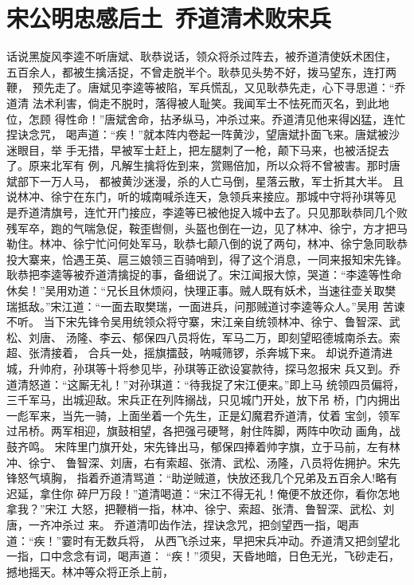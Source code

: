 \chapter{宋公明忠感后土~乔道清术败宋兵}

话说黑旋风李逵不听唐斌、耿恭说话，领众将杀过阵去，被乔道清使妖术困住，
五百余人，都被生擒活捉，不曾走脱半个。耿恭见头势不好，拨马望东，连打两鞭，
预先走了。唐斌见李逵等被陷，军兵慌乱，又见耿恭先走，心下寻思道：“乔道清
法术利害，倘走不脱时，落得被人耻笑。我闻军士不怯死而灭名，到此地位，怎顾
得性命！”唐斌舍命，拈矛纵马，冲杀过来。乔道清见他来得凶猛，连忙捏诀念咒，
喝声道：“疾！”就本阵内卷起一阵黄沙，望唐斌扑面飞来。唐斌被沙迷眼目，举
手无措，早被军士赶上，把左腿刺了一枪，颠下马来，也被活捉去了。原来北军有
例，凡解生擒将佐到来，赏赐倍加，所以众将不曾被害。那时唐斌部下一万人马，
都被黄沙迷漫，杀的人亡马倒，星落云散，军士折其大半。
且说林冲、徐宁在东门，听的城南喊杀连天，急领兵来接应。那城中守将孙琪等见
是乔道清旗号，连忙开门接应，李逵等已被他捉入城中去了。只见那耿恭同几个败
残军卒，跑的气喘急促，鞍歪辔侧，头盔也倒在一边，见了林冲、徐宁，方才把马
勒住。林冲、徐宁忙问何处军马，耿恭七颠八倒的说了两句，林冲、徐宁急同耿恭
投大寨来，恰遇王英、扈三娘领三百骑哨到，得了这个消息，一同来报知宋先锋。
耿恭把李逵等被乔道清擒捉的事，备细说了。宋江闻报大惊，哭道：“李逵等性命
休矣！”吴用劝道：“兄长且休烦闷，快理正事。贼人既有妖术，当速往壶关取樊
瑞抵敌。”宋江道：“一面去取樊瑞，一面进兵，问那贼道讨李逵等众人。”吴用
苦谏不听。
当下宋先锋令吴用统领众将守寨，宋江亲自统领林冲、徐宁、鲁智深、武松、刘唐、
汤隆、李云、郁保四八员将佐，军马二万，即刻望昭德城南杀去。索超、张清接着，
合兵一处，摇旗擂鼓，呐喊筛锣，杀奔城下来。
却说乔道清进城，升帅府，孙琪等十将参见毕，孙琪等正欲设宴款待，探马忽报宋
兵又到。乔道清怒道：“这厮无礼！”对孙琪道：“待我捉了宋江便来。”即上马
统领四员偏将，三千军马，出城迎敌。宋兵正在列阵搦战，只见城门开处，放下吊
桥，门内拥出一彪军来，当先一骑，上面坐着一个先生，正是幻魔君乔道清，仗着
宝剑，领军过吊桥。两军相迎，旗鼓相望，各把强弓硬弩，射住阵脚，两阵中吹动
画角，战鼓齐鸣。
宋阵里门旗开处，宋先锋出马，郁保四捧着帅字旗，立于马前，左有林冲、徐宁、
鲁智深、刘唐，右有索超、张清、武松、汤隆，八员将佐拥护。宋先锋怒气填胸，
指着乔道清骂道：“助逆贼道，快放还我几个兄弟及五百余人!略有迟延，拿住你
碎尸万段！”道清喝道：“宋江不得无礼！俺便不放还你，看你怎地拿我？”宋江
大怒，把鞭梢一指，林冲、徐宁、索超、张清、鲁智深、武松、刘唐，一齐冲杀过
来。
乔道清叩齿作法，捏诀念咒，把剑望西一指，喝声道：“疾！”霎时有无数兵将，
从西飞杀过来，早把宋兵冲动。乔道清又把剑望北一指，口中念念有词，喝声道：
“疾！”须臾，天昏地暗，日色无光，飞砂走石，撼地摇天。林冲等众将正杀上前，
